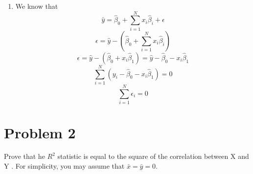 \documentclass[conference, onecolumn]{IEEEtran}
\begin{document}
\begin{enumerate}
		\item[(b)] We know that \begin{equation}
			\hat{y} = \hat{\beta}_0 + \sum_{i=1}^{N} x_i \hat{\beta}_i + \epsilon
		\end{equation}
		\begin{equation}
			\epsilon = \hat{y} - (\hat{\beta}_0 + \sum_{i=1}^{N} x_i \hat{\beta}_i)
		\end{equation}
		\begin{equation}
			\epsilon = \hat{y} - (\hat{\beta}_0 + x_i \hat{\beta}_1) = \hat{y} - \hat{\beta}_0 - x_i \hat{\beta}_1
		\end{equation}
		\begin{equation}
			\sum_{i=1}^{N} (y_i - \hat{\beta}_0 - x_i \hat{\beta}_1) = 0
		\end{equation}
		\begin{equation}
			\sum_{i=1}^{N} \epsilon_i = 0
		\end{equation}
	\end{enumerate}
	
	\section*{Problem 2}
	Prove that he $R^2$ statistic is equal to the square of the correlation between X and Y . For simplicity, you may assume that $\bar{x} = \bar{y} = 0$.
\end{document}
